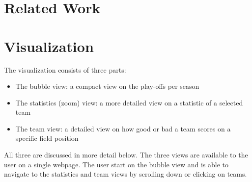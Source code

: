 \documentclass{sigchi}
\begin{document}
\section{Related Work}\label{sec:literature}


\section{Visualization}\label{sec:visualization}
The visualization consists of three parts:
\begin{itemize}
    \item The bubble view: a compact view on the play-offs per season
    \item The statistics (zoom) view: a more detailed view on a statistic of a
        selected team
    \item The team view: a detailed view on how good or bad a team scores on a
        specific field position
\end{itemize}
All three are discussed in more detail below. The three views are available to
the user on a single webpage. The user start on the bubble view and is able to
navigate to the statistics and team views by scrolling down or clicking on
teams.
\end{document}
